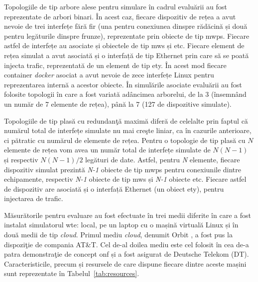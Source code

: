 Topologiile de tip arbore alese pentru simulare în cadrul evaluării au fost reprezentate de arbori binari. În acest caz, fiecare dispozitiv de rețea a avut nevoie de trei interfețe fără fir (una pentru conexiunea dinspre rădăcină și două pentru legăturile dinspre frunze), reprezentate prin obiecte de tip \gls{mwps}. Fiecare astfel de interfețe au asociate și obiectele de tip \gls{mws} și \gls{etc}. Fiecare element de rețea simulat a avut asociată și o interfață de tip Ethernet prin care să se poată injecta trafic, reprezentată de un element de tip \gls{ety}. În acest mod fiecare container \textit{docker} asociat a avut nevoie de zece interfețe Linux pentru reprezentarea internă a acestor obiecte. În simulările asociate evaluării au fost folosite topologii în care a fost variată adâncimea arborelui, de la 3 (însemnând un număr de 7 elemente de rețea), până la 7 (127 de dispozitive simulate).

Topologiile de tip plasă cu redundanţă maximă diferă de celelalte prin faptul că numărul total de interfețe simulate nu mai creşte liniar, ca în cazurile anterioare, ci pătratic cu numărul de elemente de rețea. Pentru o topologie de tip plasă cu $ N $ elemente de rețea vom avea un număr total de interfețe simulate de $ N(N-1) $ și respectiv $ N(N-1)/2 $ legături de date. Astfel, pentru \textit{N} elemente, fiecare dispozitiv simulat prezintă \textit{N-1} obiecte de tip \gls{mwps} pentru conexiunile dintre echipamente, respectiv \textit{N-1} obiecte de tip \gls{mws} și \textit{N-1} obiecte \gls{etc}. Fiecare astfel de dispozitiv are asociată și o interfață Ethernet (un obiect \gls{ety}), pentru injectarea de trafic.

Măsurătorile pentru evaluare au fost efectuate în trei medii diferite în care a fost instalat simulatorul \gls{wte}: local, pe un laptop cu o mașină virtuală Linux și în două medii de tip \textit{cloud}. Primul mediu \textit{cloud}, denumit Orbit \cite{orbitpage}, a fost pus la dispoziţie de compania AT\&T. Cel de-al doilea mediu este cel folosit în cea de-a patra demonstraţie de concept \gls{onf} și a fost asigurat de Deutsche Telekom (DT). Caracteristicile, precum și resursele de care dispune fiecare dintre aceste mașini sunt reprezentate în Tabelul~\ref{tab:resources}.


